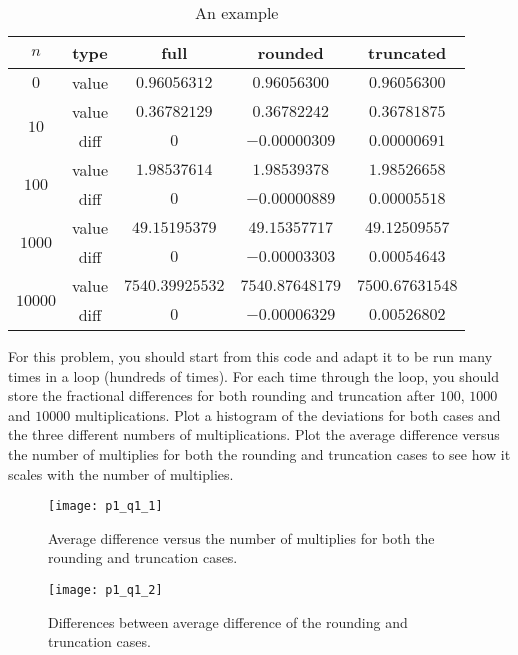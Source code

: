 \begin{table}[H]
    \centering
    \caption{An example}
    \label{tab:compare}
    \begin{tabular}{@{}ccccc@{}}
        \toprule
        $n$                      & type  & full            & rounded         & truncated       \\
        \midrule
        $0$                      & value & $0.96056312$    & $0.96056300$    & $0.96056300$    \\
        \cmidrule{1-2}
        \multirow{2}{*}{$10$}    & value & $0.36782129$    & $0.36782242$    & $0.36781875$    \\
                                 & diff  & $0$             & $-0.00000309$   & $0.00000691$    \\
        \cmidrule{1-2}
        \multirow{2}{*}{$100$}   & value & $1.98537614$    & $1.98539378$    & $1.98526658$    \\
                                 & diff  & $0$             & $-0.00000889$   & $0.00005518$    \\
        \cmidrule{1-2}
        \multirow{2}{*}{$1000$}  & value & $49.15195379$   & $49.15357717$   & $49.12509557$   \\
                                 & diff  & $0$             & $-0.00003303$   & $0.00054643$    \\
        \cmidrule{1-2}
        \multirow{2}{*}{$10000$} & value & $7540.39925532$ & $7540.87648179$ & $7500.67631548$ \\
                                 & diff  & $0$             & $-0.00006329$   & $0.00526802$    \\
        \bottomrule
    \end{tabular}
\end{table}

\Question For this problem, you should start from this code and adapt it to be run many times in a
loop (hundreds of times). For each time through the loop, you should store the fractional
differences for both rounding and truncation after $100$, $1000$ and $10000$ multiplications.
Plot a histogram of the deviations for both cases and the three different numbers of
multiplications. Plot the average difference versus the number of multiplies for both the
rounding and truncation cases to see how it scales with the number of multiplies.

\begin{figure}[H]
    \centering
    \texttt{[image: p1\_q1\_1]}
    \caption{Average difference versus the number of multiplies for both the rounding and truncation cases.}
    \label{fig:compare_rounding_truncation}
\end{figure}

\begin{figure}[H]
    \centering
    \texttt{[image: p1\_q1\_2]}
    \caption{Differences between average difference of the rounding and truncation cases.}
    \label{fig:diff_rounding_truncation}
\end{figure}

